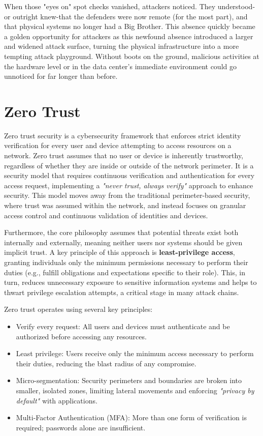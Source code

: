 When those "eyes on" spot checks vanished, attackers noticed. They understood-or outright knew-that the defenders were now remote (for the most part), and that physical systems no longer had a Big Brother. This absence quickly became a golden opportunity for attackers as this newfound absence introduced a larger and widened attack surface, turning the physical infrastructure into a more tempting attack playground. Without boots on the ground, malicious activities at the hardware level or in the data center's immediate environment could go unnoticed for far longer than before.

\section{Zero Trust}
Zero trust security is a cybersecurity framework that enforces strict identity verification for every user and device attempting to access resources on a network. Zero trust assumes that no user or device is inherently trustworthy, regardless of whether they are inside or outside of the network perimeter. It is a security model that requires continuous verification and authentication for every access request, implementing a \textit{"never trust, always verify"} approach to enhance security. This model moves away from the traditional perimeter-based security, where trust was assumed within the network, and instead focuses on granular access control and continuous validation of identities and devices.

Furthermore, the core philosophy assumes that potential threats exist both internally and externally, meaning neither users nor systems should be given implicit trust. A key principle of this approach is \textbf{least-privilege access}, granting individuals only the minimum permissions necessary to perform their duties (e.g., fulfill obligations and expectations specific to their role). This, in turn, reduces unnecessary exposure to sensitive information systems and helps to thwart privilege escalation attempts, a critical stage in many attack chains.

Zero trust operates using several key principles:
\begin{itemize}
    \item Verify every request: All users and devices must authenticate and be authorized before accessing any resources.
    \item Least privilege: Users receive only the minimum access necessary to perform their duties, reducing the blast radius of any compromise.
    \item Micro-segmentation: Security perimeters and boundaries are broken into smaller, isolated zones, limiting lateral movements and enforcing \textit{"privacy by default"} with applications.
    \item Multi-Factor Authentication (MFA): More than one form of verification is required; passwords alone are insufficient.

\end{itemize}

